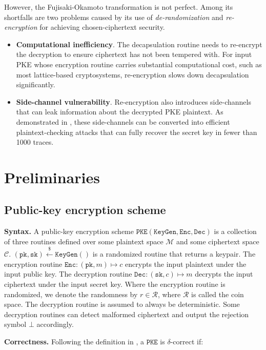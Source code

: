 \documentclass[journal=tches,submission]{iacrtrans}
\newcommand{\pke}{\texttt{PKE}}
\newcommand{\keygen}{\texttt{KeyGen}}
\newcommand{\encrypt}{\texttt{Enc}}
\newcommand{\decrypt}{\texttt{Dec}}
\newcommand{\pk}{\texttt{pk}}
\newcommand{\sk}{\texttt{sk}}
\newcommand{\leftsample}{\stackrel{\$}{\leftarrow}}
\begin{document}
However, the Fujisaki-Okamoto transformation is not perfect. Among its shortfalls are two problems caused by its use of \emph{de-randomization} and \emph{re-encryption} for achieving chosen-ciphertext security. \begin{itemize}
    \item \textbf{Computational inefficiency}. The decapsulation routine needs to re-encrypt the decryption to ensure ciphertext has not been tempered with. For input PKE whose encryption routine carries substantial computational cost, such as most lattice-based cryptosystems, re-encryption slows down decapsulation significantly.
    \item \textbf{Side-channel vulnerability}. Re-encryption also introduces side-channels that can leak information about the decrypted PKE plaintext. As demonstrated in \cite{ueno2022curse}\cite{ravi2019generic}\cite{DBLP:journals/tches/TanakaUXITH23}, these side-channels can be converted into efficient plaintext-checking attacks that can fully recover the secret key in fewer than 1000 traces.
\end{itemize}

\section{Preliminaries}

\subsection{Public-key encryption scheme}
\textbf{Syntax.} A public-key encryption scheme $\pke(\keygen, \encrypt, \decrypt)$ is a collection of three routines defined over some plaintext space $\mathcal{M}$ and some ciphertext space $\mathcal{C}$. $(\pk, \sk) \leftsample \keygen()$ is a randomized routine that returns a keypair. The encryption routine $\encrypt: (\pk, m) \mapsto c$ encrypts the input plaintext under the input public key. The decryption routine $\decrypt: (\sk, c) \mapsto m$ decrypts the input ciphertext under the input secret key. Where the encryption routine is randomized, we denote the randomness by $r \in \mathcal{R}$, where $\mathcal{R}$ is called the coin space. The decryption routine is assumed to always be deterministic. Some decryption routines can detect malformed ciphertext and output the rejection symbol $\bot$ accordingly.

\textbf{Correctness.} Following the definition in \cite{DBLP:conf/eurocrypt/DworkNR04}, a $\pke$ is $\delta$-correct if:
\end{document}
